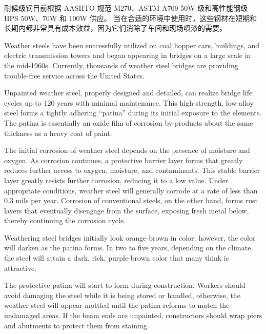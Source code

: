 耐候级钢目前根据 AASHTO 规范 M270、ASTM A709 50W 级和高性能钢级 HPS 50W、70W 和 100W 供应。 当在合适的环境中使用时，这些钢材在短期和长期内都非常具有成本效益，因为它们消除了车间和现场喷漆的需要。

Weather steels have been successfully utilized on coal hopper cars, buildings, and electric transmission towers
and began appearing in bridges on a large scale in the mid-1960s. Currently, thousands of weather steel bridges are
providing trouble-free service across the United States.

Unpainted weather steel, properly designed and detailed, can realize bridge life cycles up to 120 years with
minimal maintenance. This high-strength, low-alloy steel forms a tightly adhering “patina” during its initial
exposure to the elements. The patina is essentially an oxide film of corrosion by-products about the same thickness
as a heavy coat of paint.

The initial corrosion of weather steel depends on the presence of moisture and oxygen. As corrosion continues, a
protective barrier layer forms that greatly reduces further access to oxygen, moisture, and contaminants. This stable
barrier layer greatly resists further corrosion, reducing it to a low value. Under appropriate conditions, weather steel
will generally corrode at a rate of less than 0.3 mils per year. Corrosion of conventional steels, on the other hand,
forms rust layers that eventually disengage from the surface, exposing fresh metal below, thereby continuing the
corrosion cycle.

Weathering steel bridges initially look orange-brown in color; however, the color will darken as the patina forms.
In two to five years, depending on the climate, the steel will attain a dark, rich, purple-brown color that many think is
attractive.

The protective patina will start to form during construction. Workers should avoid damaging the steel while it is
being stored or handled, otherwise, the weather steel will appear mottled until the patina reforms to match the
undamaged areas. If the beam ends are unpainted, constructors should wrap piers and abutments to protect them
from staining.

